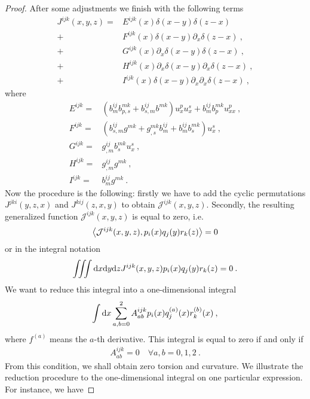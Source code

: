 \begin{proof}
    After some adjustments we finish with the following terms
    \begin{align}
        J^{ijk}(x,y,z) =& 
        E^{ijk}(x) \delta(x-y) \delta(z-x) 
        \\+& F^{ijk}(x) \delta(x-y) \partial_x \delta(z-x) \:,
        \\+& G^{ijk}(x) \partial_x \delta(x-y) \delta (z-x) \:,
        \\+& H^{ijk}(x) \partial_x \delta(x-y) \partial_x \delta (z-x) \:,
        \\+& I^{ijk}(x) \delta(x-y) \partial_x \partial_x \delta (z-x) \:,
    \end{align}
    where
    \begin{align}
        E^{ijk} =& (b^{ij}_m b^{mk}_{p,s} + b^{ij}_{s,m} b^{mk} ) u^p_x u^s_x + b^{ij}_m b^{mk}_p u^p_{xx} \:, \\
        F^{ijk} =& (b^{ij}_{s,m} g^{mk} + g^{mk}_{,s} b^{ij}_m + b^{ij}_m b^{mk}_s)u_x^s \:, \\
        G^{ijk} =& g^{ij}_{,m} b^{mk}_s u^s_x \:,\\
        H^{ijk} =& g^{ij}_{,m} g^{mk} \:,\\
        I^{ijk} =& b^{ij}_m g^{mk} \:.
    \end{align}
    Now the procedure is the following: firstly we have to add the cyclic permutations $J^{jki}(y,z,x)$ and $J^{kij}(z,x,y)$ to obtain $\mathcal J^{ijk}(x,y,z)$. Secondly, the resulting generalized function $\mathcal J^{ijk}(x,y,z)$ is equal to zero, i.e.
    \begin{align}
        \left \langle \mathcal J^{ijk}(x,y,z) ,p_i(x)q_j(y)r_k(z) \right \rangle = 0
    \end{align}
    or in the integral notation 
    \begin{align}
        \iiint \mathrm{d} x \mathrm{d} y \mathrm{d} z J^{ijk}(x,y,z) p_i(x)q_j(y)r_k(z) = 0 \:.
    \end{align}
    We want to reduce this integral into a one-dimensional integral
    \begin{align}
        \int \mathrm{d} x \sum_{a,b = 0}^2 A^{ijk}_{ab} p_i(x) q^{(a)}_j(x) r^{(b)}_k (x) \:,
    \end{align}
    where $f^{(a)}$ means the $a$-th derivative. This integral is equal to zero if and only if
    \begin{align}
        A^{ijk}_{ab} = 0 \quad \forall a,b = 0,1,2 \:.
    \end{align}
    From this condition, we shall obtain zero torsion and curvature.
    We illustrate the reduction procedure to the one-dimensional integral on one particular expression. For instance, we have

\end{proof}
